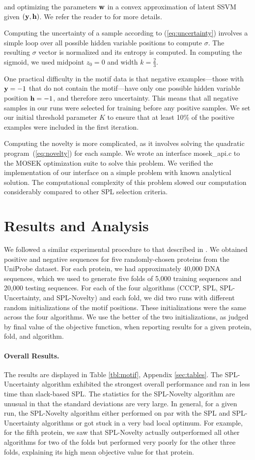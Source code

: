 \documentclass{article}
\newcommand{\mysection}[1]{\vspace{-4mm}\section{#1}\vspace{-4mm}}
\newcommand{\myparagraph}[1]{\vspace{-2mm}\paragraph{#1}}
\begin{document}
and optimizing the parameters $\bf w$ in a convex approximation of latent SSVM given $(\bf y, \bf h)$.  We refer the reader to \cite{SSVM} for more details.

Computing the uncertainty of a sample according to (\ref{eq:uncertainty}) involves a simple loop over all possible hidden variable positions to compute $\sigma$.  The resulting $\sigma$ vector is normalized and its entropy is computed.  In computing the sigmoid, we used midpoint $z_0=0$ and width $k=\frac{2}{3}$.

One practical difficulty in the motif data is that negative examples---those with ${\bf y}=-1$ that do not contain the motif---have only one possible hidden variable position ${\bf h}=-1$, and therefore zero uncertainty.  This means that all negative samples in our runs were selected for training before any positive samples.  We set our initial threshold parameter $K$ to ensure that at least 10\% of the positive examples were included in the first iteration. 

Computing the novelty is more complicated, as it involves solving the quadratic program~(\ref{eq:novelty}) for each sample.  We wrote an interface {\sc mosek\_api.c} to the MOSEK optimization suite \cite{Mosek} to solve this problem.  We verified the implementation of our interface on a simple problem with known analytical solution.  The computational complexity of this problem slowed our computation considerably compared to other SPL selection criteria.

\mysection{Results and Analysis}
\label{sec:results}

We followed a similar experimental procedure to that described in \cite{SPL}. We obtained positive and negative sequences for five randomly-chosen proteins from the UniProbe dataset. For each protein, we had approximately 40,000 DNA sequences, which we used  to generate five folds of 5,000 training sequences and 20,000 testing sequences. For each of the four algorithms (CCCP, SPL, SPL-Uncertainty, and SPL-Novelty) and each fold, we did two runs with different random initializations of the motif positions. These initializations were the same across the four algorithms. We use the better of the two initializations, as judged by final value of the objective function, when reporting results for a given protein, fold, and algorithm. 

\myparagraph{Overall Results.} The results are displayed in Table \ref{tbl:motif}, Appendix \ref{sec:tables}. The SPL-Uncertainty algorithm exhibited the strongest overall performance and ran in less time than slack-based SPL. The statistics for the SPL-Novelty algorithm are unusual in that the standard deviations are very large. In general, for a given run, the SPL-Novelty algorithm either performed on par with the SPL and SPL-Uncertainty algorithms or got stuck in a very bad local optimum. For example, for the fifth protein, we saw that SPL-Novelty actually outperformed all other algorithms for two of the folds but performed very poorly for the other three folds, explaining its high mean objective value for that protein. 
\end{document}

